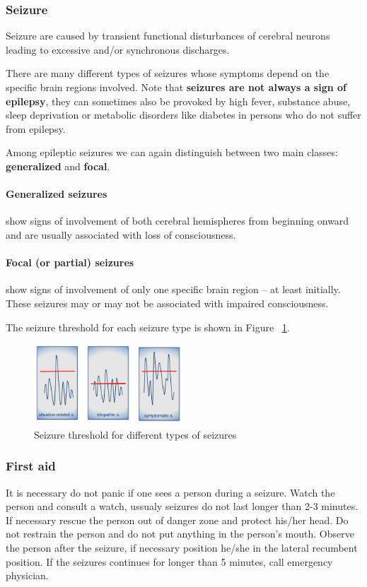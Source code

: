 \documentclass[12pt,article,oneside,a4paper]{memoir}
\begin{document}
\subsubsection{Seizure}
Seizure are caused by transient functional disturbances of cerebral neurons leading to excessive and/or synchronous discharges.

There are many different types of seizures whose symptoms depend on the specific brain regions involved. 
Note that \textbf{seizures are not always a sign of epilepsy}, they can sometimes also be provoked by high fever, substance abuse, sleep deprivation or metabolic disorders like diabetes in persons who do not suffer from epilepsy.

Among epileptic seizures we can again distinguish between two main classes: \textbf{generalized} and \textbf{focal}.

\paragraph{Generalized seizures} show signs of involvement of both cerebral hemispheres from beginning onward and are usually associated with loss of consciousness.

\paragraph{Focal (or partial) seizures} show signs of involvement of only one specific brain region – at least initially. These seizures may or may not be associated with impaired consciousness.

The seizure threshold for each seizure type is shown in Figure ~\ref{fig:seizure-threshold}.

\begin{figure}
  \centering
  \includegraphics[width=0.5\textwidth]{imgs/seizure-threshold.png}
  \caption{Seizure threshold for different types of seizures}
  \label{fig:seizure-threshold}
\end{figure}

\subsubsection{First aid}
It is necessary do not panic if one sees a person during a seizure. Watch the person and consult a watch, ussualy seizures do not last longer than 2-3 minutes. If necessary rescue the person out of danger zone and protect his/her head.
Do not restrain the person and do not put anything in the person's mouth. Observe the person after the seizure, if necessary position he/she in the lateral recumbent position. If the seizures continues for longer than 5 minutes, call emergency physician.
\end{document}
